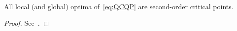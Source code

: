 \documentclass{article}
\newcommand{\1}{\mathbf{1}}
\begin{document}
\begin{proposition}\label{prop:optconditions}
	All local (and global) optima of~\eqref{eq:QCQP} are second-order critical points.
\end{proposition}
\begin{proof}
	See~\cite[Rem.~4.2 and Cor.~4.2]{yang2012optimality}.
\end{proof}
%
%
\end{document}
